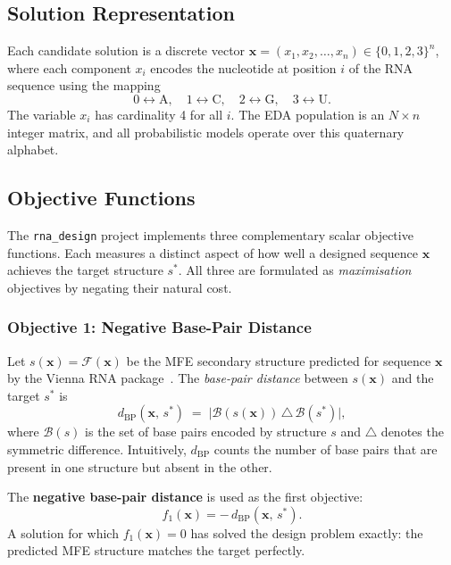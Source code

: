 \documentclass[11pt,a4paper]{article}
\begin{document}
\subsection{Solution Representation}

Each candidate solution is a discrete vector
$\mathbf{x} = (x_1, x_2, \ldots, x_n) \in \{0,1,2,3\}^n$,
where each component $x_i$ encodes the nucleotide at position $i$ of the
RNA sequence using the mapping
\[
  0 \leftrightarrow \mathrm{A}, \quad
  1 \leftrightarrow \mathrm{C}, \quad
  2 \leftrightarrow \mathrm{G}, \quad
  3 \leftrightarrow \mathrm{U}.
\]
The variable $x_i$ has cardinality 4 for all $i$. The EDA population is an
$N \times n$ integer matrix, and all probabilistic models operate over this
quaternary alphabet.

\subsection{Objective Functions}

The \texttt{rna\_design} project implements three complementary scalar
objective functions. Each measures a distinct aspect of how well a designed
sequence $\mathbf{x}$ achieves the target structure $s^*$. All three are
formulated as \emph{maximisation} objectives by negating their natural
cost.

\subsubsection{Objective 1: Negative Base-Pair Distance}
\label{sec:obj1}

Let $s(\mathbf{x}) = \mathcal{F}(\mathbf{x})$ be the MFE secondary structure
predicted for sequence $\mathbf{x}$ by the Vienna RNA package~\cite{lorenz2011viennarna}. The
\emph{base-pair distance} between $s(\mathbf{x})$ and the target $s^*$ is
\[
  d_{\mathrm{BP}}(\mathbf{x},\, s^*) \;=\;
    \bigl|\mathcal{B}(s(\mathbf{x})) \,\triangle\, \mathcal{B}(s^*)\bigr|,
\]
where $\mathcal{B}(s)$ is the set of base pairs encoded by structure $s$ and
$\triangle$ denotes the symmetric difference. Intuitively,
$d_{\mathrm{BP}}$ counts the number of base pairs that are present in one
structure but absent in the other.

The \textbf{negative base-pair distance} is used as the first objective:
\[
  f_1(\mathbf{x}) = -\,d_{\mathrm{BP}}(\mathbf{x},\, s^*).
\]
A solution for which $f_1(\mathbf{x}) = 0$ has solved the design problem
exactly: the predicted MFE structure matches the target perfectly.
\end{document}
